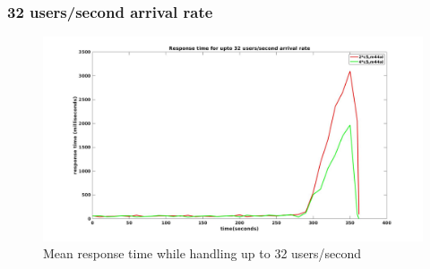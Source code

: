\begin{frame}
\frametitle{32 users/second arrival rate}
\begin{figure}[h]
	\centering
	\includegraphics[width=1\textwidth, height=0.5\textheight]{images/scale32.jpg}
	\caption{Mean response time while handling up to 32 users/second}\label{fig:sqlopt}
\end{figure}
\end{frame}

